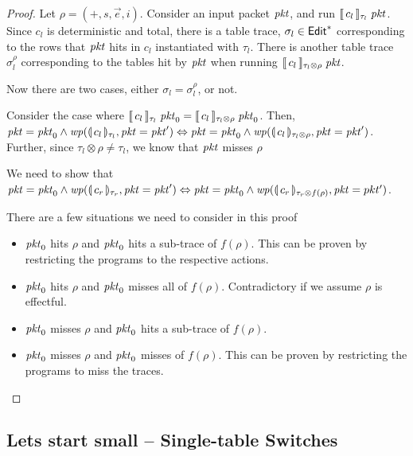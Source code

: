 \begin{proof}
  Let $\rho = (+, s, \vec e, i)$. Consider an input packet $\mathit{pkt}$, and
  run $\llbracket\,c_l\,\rrbracket_{\tau_l}\; \mathit{pkt}$. Since $c_l$ is deterministic and
  total, there is a table trace, $\sigma_l \in \mathsf{Edit}^*$ corresponding
  to the rows that $\mathit{pkt}$ hits in $c_l$ instantiated with
  $\tau_l$. There is another table trace $\sigma_l^\rho$ corresponding
  to the tables hit by $\mathit{pkt}$ when running
  $\llbracket\,c_l\,\rrbracket_{\tau_l \otimes \rho}\; \mathit{pkt}$.

  Now there are two cases, either $\sigma_l = \sigma_l^\rho$, or not.



  Consider the case where
  $\llbracket\,c_l\,\rrbracket_{\tau_l}\; \mathit{pkt}_0 = \llbracket\,c_l\,\rrbracket_{\tau_l \otimes \rho}
  \; \mathit{pkt}_0$. Then,
  $\mathit{pkt} = \mathit{pkt}_0 \wedge \mathit{wp}(\llparenthesis\, c_l\, \rrparenthesis_{\tau_l}, \mathit{pkt} = \mathit{pkt}')
  \Leftrightarrow \mathit{pkt} = \mathit{pkt}_0 \wedge \mathit{wp}(\llparenthesis\, c_l\, \rrparenthesis_{\tau_l
    \otimes \rho}, \mathit{pkt} = \mathit{pkt}')$. Further, since
  $\tau_l \otimes \rho \neq \tau_l$, we know that $\mathit{pkt}$ misses
  $\rho$


  We need to show that
  $\mathit{pkt} = \mathit{pkt}_0 \wedge \mathit{wp}(\llparenthesis\, c_r\, \rrparenthesis_{\tau_r}, \mathit{pkt} = \mathit{pkt}')
  \Leftrightarrow \mathit{pkt} = \mathit{pkt}_0 \wedge \mathit{wp} (\llparenthesis\, c_r\, \rrparenthesis_{\tau_r
    \otimes f(\rho)}, \mathit{pkt} = pkt')$.


  There are a few situations we need to consider in this proof
  \begin{itemize}
  \item $\mathit{pkt}_0$ hits $\rho$ and $\mathit{pkt}_0$ hits a sub-trace of
    $f(\rho)$. This can be proven by restricting the programs to the
    respective actions.
    
  \item $\mathit{pkt}_0$ hits $\rho$ and $\mathit{pkt}_0$ misses all of
    $f(\rho)$. Contradictory if we assume $\rho$ is effectful.

  \item $\mathit{pkt}_0$ misses $\rho$ and $\mathit{pkt}_0$ hits a sub-trace of $f(\rho)$.
  \item $\mathit{pkt}_0$ misses $\rho$ and $\mathit{pkt}_0$ misses of $f(\rho)$. This
    can be proven by restricting the programs to miss the traces.
  \end{itemize}
  
\end{proof}

\subsection{Lets start small -- Single-table Switches}

